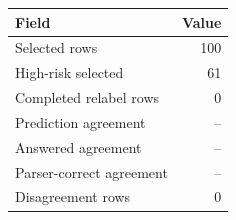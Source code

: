 \begin{tabular}{lr}
\toprule
Field & Value \\
\midrule
Selected rows & 100 \\
High-risk selected & 61 \\
Completed relabel rows & 0 \\
Prediction agreement & -- \\
Answered agreement & -- \\
Parser-correct agreement & -- \\
Disagreement rows & 0 \\
\bottomrule
\end{tabular}
